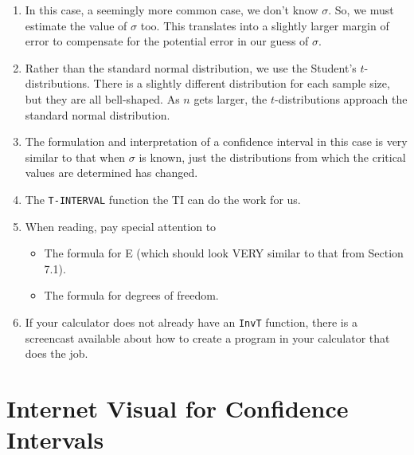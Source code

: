 \documentclass{article}
\begin{document}
\begin{enumerate}

    \item In this case, a seemingly more common case, we don’t know $\sigma$. So, we must estimate the value of $\sigma$ too. This translates into a slightly larger margin of error to compensate for the potential error in our guess of $\sigma$.
    
    \item Rather than the standard normal distribution, we use the Student's $t$-distributions. There is a slightly different distribution for each sample size, but they are all bell-shaped.  As $n$ gets larger, the $t$-distributions approach the standard normal distribution.
    
    \item The formulation and interpretation of a confidence interval in this case is very similar to that when $\sigma$ is known, just the distributions from which the critical values are determined has changed.
    
    \item The \texttt{T-INTERVAL} function the TI can do the work for us.
    
    \item When reading, pay special attention to
    
        \begin{itemize}
        
            \item The formula for E (which should look VERY similar to that from Section 7.1).
            
            \item The formula for degrees of freedom.
            
        \end{itemize}
        
    \item If your calculator does not already have an \texttt{InvT} function, there is a screencast available about how to create a program in your calculator that does the job.
    
\end{enumerate}

\section*{Internet Visual for Confidence Intervals}
\end{document}
